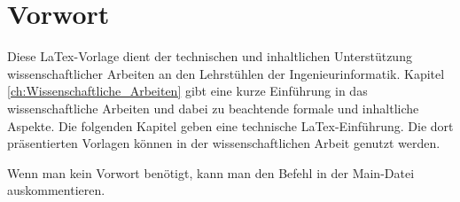 \chapter*{Vorwort}
Diese LaTex-Vorlage dient der technischen und inhaltlichen Unterstützung wissenschaftlicher Arbeiten an den Lehrstühlen der Ingenieurinformatik. Kapitel \ref{ch:Wissenschaftliche_Arbeiten} gibt eine kurze Einführung in das wissenschaftliche Arbeiten und dabei zu beachtende formale und inhaltliche Aspekte. Die folgenden Kapitel geben eine technische LaTex-Einführung. Die dort präsentierten Vorlagen können in der wissenschaftlichen Arbeit genutzt werden.

Wenn man kein Vorwort benötigt, kann man den Befehl \verb++ in der Main-Datei auskommentieren.
\cleardoublepage